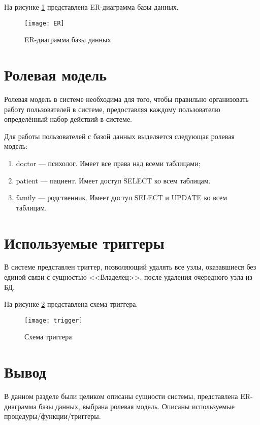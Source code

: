 На рисунке \ref{DB} представлена ER-диаграмма базы данных.
\begin{figure}[ht!]\centering
	\texttt{[image: ER]}
	\caption{ER-диаграмма базы данных}
	\label{DB}
\end{figure}

\section{Ролевая модель}

Ролевая модель в системе необходима для того, чтобы правильно организовать работу пользователей в системе, предоставляя каждому пользователю определённый набор действий в системе.

Для работы пользователей с базой данных выделяется следующая ролевая модель:
\begin{enumerate}[label=\arabic*.]
	\item doctor --- психолог. Имеет все права над всеми таблицами;
	\item patient --- пациент. Имеет доступ SELECT ко всем таблицам.
	\item family --- родственник. Имеет доступ SELECT и UPDATE ко всем таблицам.
\end{enumerate}

\section{Используемые триггеры}

В системе представлен триггер, позволяющий удалять все узлы, оказавшиеся без единой связи с сущностью <<Владелец>>, после удаления очередного узла из БД.

На рисунке \ref{trigger} представлена схема триггера.

\begin{figure}[ht!]\centering
	\texttt{[image: trigger]}
	\caption{Схема триггера}
	\label{trigger}
\end{figure}


\section*{Вывод}

В данном разделе были целиком описаны сущности системы, представлена ER-диаграмма базы данных, выбрана ролевая модель. Описаны используемые процедуры/функции/триггеры.